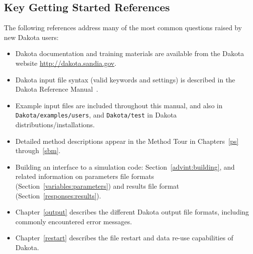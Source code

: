  
\subsection{Key Getting Started References}\label{tutorial:keyrefs}

The following references address many of the most common questions
raised by new Dakota users:
\begin{itemize}
\item Dakota documentation and training materials are available from
  the Dakota website \url{http://dakota.sandia.gov}.

\item Dakota input file syntax (valid keywords and settings) is
  described in the Dakota Reference Manual~\cite{RefMan}.

\item Example input files are included throughout this manual, and
  also in {\tt Dakota/examples/users}, 
  \newline and {\tt Dakota/test} in Dakota distributions/installations.

\item Detailed method descriptions appear in the Method Tour in
  Chapters~\ref{ps} through~\ref{sbm}.

\item Building an interface to a simulation code:
  Section~\ref{advint:building}, and related information on parameters
  file formats (Section~\ref{variables:parameters}) and results file
  format (Section~\ref{responses:results}).

\item Chapter~\ref{output} describes the different Dakota output file
  formats, including commonly encountered error messages.

\item Chapter~\ref{restart} describes the file restart and data re-use
  capabilities of Dakota.

\end{itemize}
